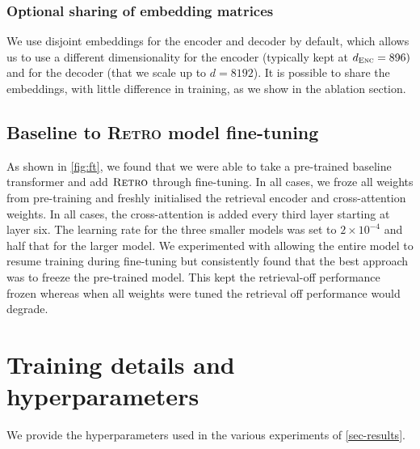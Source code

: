 \documentclass[11pt, a4paper, logo]{deepmind}
\newcommand{\retro}{\textsc{Retro}\xspace}
\begin{document}
\subsubsection{Optional sharing of embedding matrices}\label{app:shared_embedding}

We use disjoint embeddings for the encoder and decoder by default, which allows us to use a different dimensionality for the encoder (typically kept at $d_{\textsc{Enc}} = 896)$ and for the decoder (that we scale up to $d=8192$). It is possible to share the embeddings, with little difference in training, as we show in the ablation section.


\subsection{Baseline to \retro model fine-tuning}
As shown in \autoref{fig:ft}, we found that we were able to take a pre-trained baseline transformer and add $\retro$ through fine-tuning.
In all cases, we froze all weights from pre-training and freshly initialised the retrieval encoder and cross-attention weights. In all cases, the cross-attention is added every third layer starting at layer six.
The learning rate for the three smaller models was set to $2 \times 10^{-4}$ and half that for the larger model.
We experimented with allowing the entire model to resume training during fine-tuning but consistently found that the best approach was to freeze the pre-trained model.
This kept the retrieval-off performance frozen whereas when all weights were tuned the retrieval off performance would degrade. 

\section{Training details and hyperparameters}

We provide the hyperparameters used in the various experiments of \autoref{sec-results}.
\end{document}
